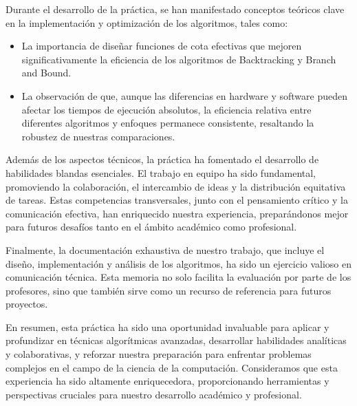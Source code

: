 \documentclass{article}
\begin{document}
Durante el desarrollo de la práctica, se han manifestado conceptos teóricos clave en la implementación y optimización de los algoritmos, tales como:

\begin{itemize}
\item La importancia de diseñar funciones de cota efectivas que mejoren significativamente la eficiencia de los algoritmos de Backtracking y Branch and Bound.
\item La observación de que, aunque las diferencias en hardware y software pueden afectar los tiempos de ejecución absolutos, la eficiencia relativa entre diferentes algoritmos y enfoques permanece consistente, resaltando la robustez de nuestras comparaciones.
\end{itemize}

Además de los aspectos técnicos, la práctica ha fomentado el desarrollo de habilidades blandas esenciales. El trabajo en equipo ha sido fundamental, promoviendo la colaboración, el intercambio de ideas y la distribución equitativa de tareas. Estas competencias transversales, junto con el pensamiento crítico y la comunicación efectiva, han enriquecido nuestra experiencia, preparándonos mejor para futuros desafíos tanto en el ámbito académico como profesional.

Finalmente, la documentación exhaustiva de nuestro trabajo, que incluye el diseño, implementación y análisis de los algoritmos, ha sido un ejercicio valioso en comunicación técnica. Esta memoria no solo facilita la evaluación por parte de los profesores, sino que también sirve como un recurso de referencia para futuros proyectos.

En resumen, esta práctica ha sido una oportunidad invaluable para aplicar y profundizar en técnicas algorítmicas avanzadas, desarrollar habilidades analíticas y colaborativas, y reforzar nuestra preparación para enfrentar problemas complejos en el campo de la ciencia de la computación. Consideramos que esta experiencia ha sido altamente enriquecedora, proporcionando herramientas y perspectivas cruciales para nuestro desarrollo académico y profesional.
\end{document}
